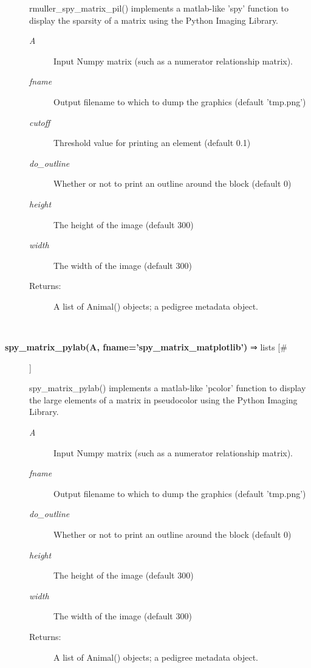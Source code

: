 \begin{description}
 rmuller\_spy\_matrix\_pil() implements a matlab-like 'spy' function to display the sparsity of a matrix using the Python Imaging Library.
\begin{description}
\item[\emph{A}
] Input Numpy matrix (such as a numerator relationship matrix).
\item[\emph{fname}
] Output filename to which to dump the graphics (default 'tmp.png')
\item[\emph{cutoff}
] Threshold value for printing an element (default 0.1)
\item[\emph{do\_outline}
] Whether or not to print an outline around the block (default 0)
\item[\emph{height}
] The height of the image (default 300)
\item[\emph{width}
] The width of the image (default 300)
\item[Returns:] A list of Animal() objects; a pedigree metadata object.

\end{description}
\\ 

\item[\textbf{spy\_matrix\_pylab(A, fname='spy\_matrix\_matplotlib')}
 ⇒ lists [\#]]

 spy\_matrix\_pylab() implements a matlab-like 'pcolor' function to display the large elements of a matrix in pseudocolor using the Python Imaging Library.
\begin{description}
\item[\emph{A}
] Input Numpy matrix (such as a numerator relationship matrix).
\item[\emph{fname}
] Output filename to which to dump the graphics (default 'tmp.png')
\item[\emph{do\_outline}
] Whether or not to print an outline around the block (default 0)
\item[\emph{height}
] The height of the image (default 300)
\item[\emph{width}
] The width of the image (default 300)
\item[Returns:] A list of Animal() objects; a pedigree metadata object.

\end{description}
\\ 


\end{description}

